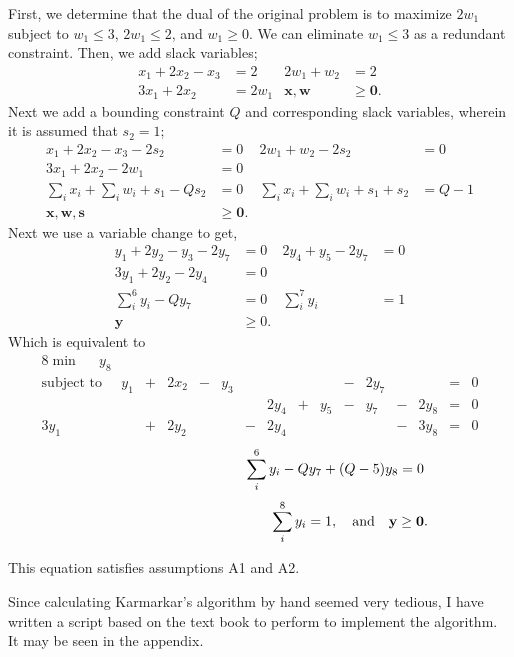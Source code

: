 \documentclass[12pt]{amsart}
\begin{document}
First, we determine that the dual of the original problem is
to maximize \(2w_1\) subject to \(w_1\leq3\), \(2w_1\leq2\), and \(w_1\geq0\).
We can eliminate \(w_1\leq3\) as a redundant constraint.
Then, we add slack variables;
\begin{align*}
	x_1 + 2x_2 - x_3 &= 2 & 2w_1 + w_2 &= 2 \\
	3x_1 + 2x_2 &= 2w_1 & \mathbf{x}, \mathbf{w} &\geq \mathbf{0}.
\end{align*}
Next we add a bounding constraint \(Q\) and corresponding slack variables, 
wherein it is assumed that \(s_2=1\);
\begin{align*}
	x_1 + 2x_2 - x_3 - 2s_2 &= 0 & 2w_1 + w_2 -2s_2 &= 0 \\
	3x_1 + 2x_2 - 2w_1 &= 0   \\
	\sum_{i}x_i + \sum_{i}w_i + s_1 - Qs_2 &= 0 & \sum_{i}x_i+\sum_{i}w_i + s_1 + s_2 &= Q-1 \\
	\mathbf{x}, \mathbf{w}, \mathbf{s} &\geq \mathbf{0}.
\end{align*}
Next we use a variable change to get,
\begin{align*}
	y_1 + 2y_2 - y_3 - 2y_7 &= 0 & 2y_4 + y_5 -2y_7 &= 0 \\
	3y_1 + 2y_2 - 2y_4 &= 0   \\
	\sum_i^6y_i - Qy_7 &= 0 & \sum_{i}^7y_i &= 1 \\
	\mathbf{y} &\geq 0.
\end{align*}
Which is equivalent to 
\begin{alignat*}{8}
	\min\quad\,\ y_8 \\
	\text{subject to}\quad\,\ 
	 y_1& {}+{} & 2x_2& {}-{} & y_3 &  { }  &  {}  &  { }  & {}  & {}-{} & 2y_7 &  { }  & {}  & {}={} & 0 \\
	 {} &  { }  &  {} &  { }  & {}  &  { }  & 2y_4 & {}+{} & y_5 & {}-{} & y_7  & {}-{} & 2y_8& {}={} & 0 \\
	3y_1& {}+{} & 2y_2&  { }  & {}  & {}-{} & 2y_4 &  { }  & {}  &  { }  & {}   & {}-{} & 3y_8& {}={} & 0 
\end{alignat*}
\[ \hspace{25ex} \sum_i^6y_i - Qy_7 + (Q-5)y_8  {}={} 0 \]
\[ \hspace{30ex} \sum_i^8y_i = 1,\quad \text{and} \quad \mathbf{y} \geq \mathbf{0} .\]

This equation satisfies assumptions A1 and A2.

\clearpage

Since calculating Karmarkar's algorithm by hand seemed very tedious, 
I have written a script based on the text book to perform to implement the algorithm.
It may be seen in the appendix. \\
\end{document}
